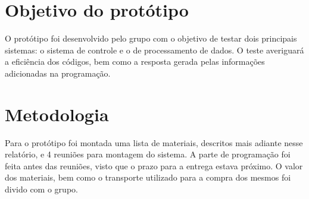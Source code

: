 \section{Objetivo do protótipo}
O protótipo foi desenvolvido pelo grupo com o objetivo de testar dois principais sistemas: o sistema de controle e o de processamento de dados. O teste averiguará a eficiência dos códigos, bem como a resposta gerada pelas informações adicionadas na programação.
\section{Metodologia}
Para o protótipo foi montada uma lista de materiais, descritos mais adiante nesse relatório, e 4 reuniões para montagem do sistema. A parte de programação foi feita antes das reuniões, visto que o prazo para a entrega estava próximo. O valor dos materiais, bem como o transporte utilizado para a compra dos mesmos foi divido com o grupo.
